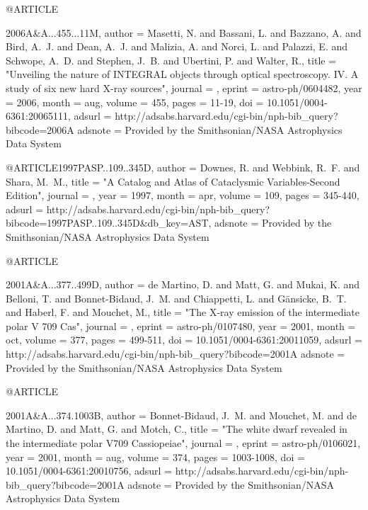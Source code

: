 @ARTICLE{2006A&A...455...11M,
   author = {{Masetti}, N. and {Bassani}, L. and {Bazzano}, A. and {Bird}, A.~J. and 
	{Dean}, A.~J. and {Malizia}, A. and {Norci}, L. and {Palazzi}, E. and 
	{Schwope}, A.~D. and {Stephen}, J.~B. and {Ubertini}, P. and 
	{Walter}, R.},
    title = "{Unveiling the nature of INTEGRAL objects through optical spectroscopy. IV. A study of six new hard X-ray sources}",
  journal = {\aap},
   eprint = {astro-ph/0604482},
     year = 2006,
    month = aug,
   volume = 455,
    pages = {11-19},
      doi = {10.1051/0004-6361:20065111},
   adsurl = {http://adsabs.harvard.edu/cgi-bin/nph-bib_query?bibcode=2006A%
  adsnote = {Provided by the Smithsonian/NASA Astrophysics Data System}
}



@ARTICLE{1997PASP..109..345D,
   author = {{Downes}, R. and {Webbink}, R.~F. and {Shara}, M.~M.},
    title = "{A Catalog and Atlas of Cataclysmic Variables-Second Edition}",
  journal = {\pasp},
     year = 1997,
    month = apr,
   volume = 109,
    pages = {345-440},
   adsurl = {http://adsabs.harvard.edu/cgi-bin/nph-bib_query?bibcode=1997PASP..109..345D&db_key=AST},
  adsnote = {Provided by the Smithsonian/NASA Astrophysics Data System}
}



@ARTICLE{2001A&A...377..499D,
   author = {{de Martino}, D. and {Matt}, G. and {Mukai}, K. and {Belloni}, T. and 
	{Bonnet-Bidaud}, J.~M. and {Chiappetti}, L. and {G{\"a}nsicke}, B.~T. and 
	{Haberl}, F. and {Mouchet}, M.},
    title = "{The X-ray emission of the intermediate polar V 709 Cas}",
  journal = {\aap},
   eprint = {astro-ph/0107480},
     year = 2001,
    month = oct,
   volume = 377,
    pages = {499-511},
      doi = {10.1051/0004-6361:20011059},
   adsurl = {http://adsabs.harvard.edu/cgi-bin/nph-bib_query?bibcode=2001A%
  adsnote = {Provided by the Smithsonian/NASA Astrophysics Data System}
}



@ARTICLE{2001A&A...374.1003B,
   author = {{Bonnet-Bidaud}, J.~M. and {Mouchet}, M. and {de Martino}, D. and 
	{Matt}, G. and {Motch}, C.},
    title = "{The white dwarf revealed in the intermediate polar V709 Cassiopeiae}",
  journal = {\aap},
   eprint = {astro-ph/0106021},
     year = 2001,
    month = aug,
   volume = 374,
    pages = {1003-1008},
      doi = {10.1051/0004-6361:20010756},
   adsurl = {http://adsabs.harvard.edu/cgi-bin/nph-bib_query?bibcode=2001A%
  adsnote = {Provided by the Smithsonian/NASA Astrophysics Data System}
}



}}}
